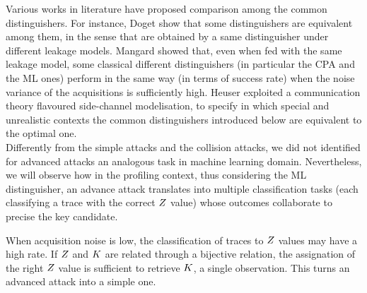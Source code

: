 Various works in literature have proposed comparison among the common distinguishers. For instance, Doget \etal \cite{doget2011univariate} show that some distinguishers are equivalent among them, in the sense that are obtained by a same distinguisher under different leakage models. Mangard \etal \cite{mangard2011one} showed that, even when fed with the same leakage model, some classical different distinguishers (in particular the CPA and the ML ones) perform in the same way (in terms of success rate) when the noise variance of the acquisitions is sufficiently high. Heuser \etal \cite{heuser2014good} exploited a communication theory flavoured side-channel modelisation, to specify in which special and unrealistic contexts the common distinguishers introduced below are equivalent to the optimal one.\\

Differently from the simple attacks and the collision attacks, we did not identified for advanced attacks an analogous task in machine learning domain. Nevertheless, we will observe how in the profiling context, thus considering the ML distinguisher, an advance attack translates into multiple classification tasks (each classifying a trace with the correct $Z$ value) whose outcomes collaborate to precise the key candidate. 

\begin{remark}\label{rem:advanced_to_simple}
When acquisition noise is low, the classification of traces to $Z$ values may have a high rate. If $Z$ and $K$ are related through a bijective relation, the assignation of the right $Z$ value is sufficient to retrieve $K$, \via a single observation. This turns an advanced attack into a simple one.
\end{remark}


